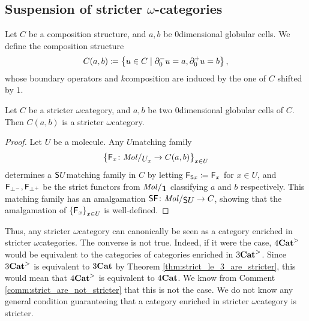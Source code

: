 \subsection{Suspension of stricter \texorpdfstring{$\omega$}{ω}-categories} \label{subsec:suspension}

\begin{dfn} 
    Let \( C \) be a composition structure, and \( a, b \) be \( 0 \)\nbd dimensional globular cells.
    We define the composition structure
    \begin{equation*}
        C(a, b) \coloneqq \left\{ {u \in C \mid \partial_{0}^{-} u = a, \partial_{0}^{+} u = b} \right\},    
    \end{equation*}
    whose boundary operators and \( k \)\nbd composition are induced by the one of \( C \) shifted by \( 1 \).
\end{dfn}

\begin{lem} \label{lem:hom_of_stricter_is_stricter}
    Let \( C \) be a stricter \( \omega \)\nbd category, and \( a, b \) be two \( 0 \)\nbd dimensional globular cells of \( C \).
    Then \( C(a, b) \) is a stricter \( \omega \)\nbd category.
\end{lem}
\begin{proof}
    Let \( U \) be a molecule.
    Any \( U \)\nbd matching family 
    \begin{equation*}
        \set{\F_x \colon \molecin{\imel{U}{x}} \to C(a, b)}_{x \in U}
    \end{equation*}
    determines a \( \mathsf{S}{U} \)\nbd matching family in \( C \) by letting \( \mathsf{F}_{\mathsf{S}{x}} \coloneqq \mathsf{F}_x \) for \( x \in U \), and \( \mathsf{F}_{\bot^-}, \mathsf{F}_{\bot^+} \) be the strict functors from \( \molecin{\pt} \) classifying \( a \) and \( b \) respectively. 
    This matching family has an amalgamation \( \sus{\F} \colon \molecin{\sus{U}} \to C \), showing that the amalgamation of \( \left\{ {\mathsf{F}_x} \right\}_{x \in U} \) is well-defined.
\end{proof}

\begin{comm}
    Thus, any stricter \( \omega \)\nbd category can canonically be seen as a category enriched in stricter \( \omega \)\nbd categories.
    The converse is not true. 
    Indeed, if it were the case, \( {4\mathbf{Cat}}^> \) would be equivalent to the categories of categories enriched in \( {3\mathbf{Cat}}^> \).
    Since \( {3\mathbf{Cat}}^> \) is equivalent to \( {3\mathbf{Cat}} \) by Theorem \ref{thm:strict_le_3_are_stricter}, this would mean that \( {4\mathbf{Cat}}^> \) is equivalent to \( {4\mathbf{Cat}} \).
    We know from Comment \ref{comm:strict_are_not_stricter} that this is not the case.
    We do not know any general condition guaranteeing that a category enriched in stricter \( \omega \)\nbd category is stricter.
\end{comm}

